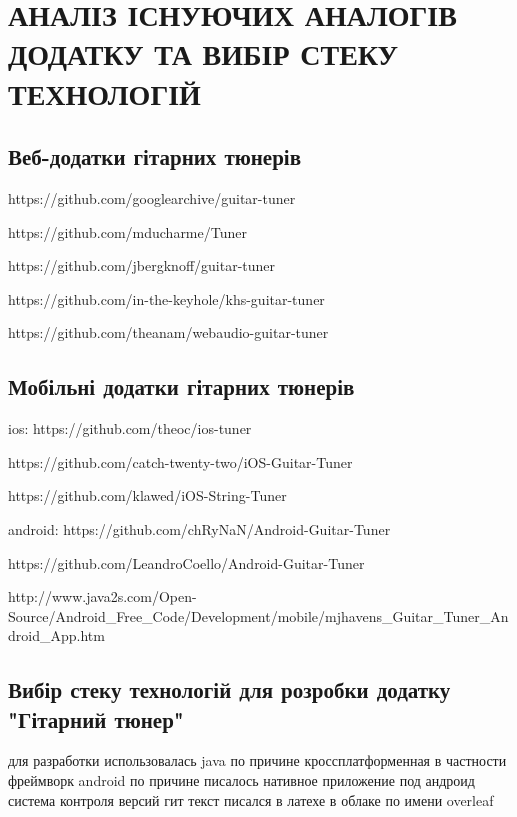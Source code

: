 \section{АНАЛІЗ ІСНУЮЧИХ АНАЛОГІВ ДОДАТКУ ТА ВИБІР СТЕКУ ТЕХНОЛОГІЙ}


\subsection{Веб-додатки гітарних тюнерів}

https://github.com/googlearchive/guitar-tuner

https://github.com/mducharme/Tuner

https://github.com/jbergknoff/guitar-tuner

https://github.com/in-the-keyhole/khs-guitar-tuner

https://github.com/theanam/webaudio-guitar-tuner

\subsection{Мобільні додатки гітарних тюнерів}
ios:
https://github.com/theoc/ios-tuner

https://github.com/catch-twenty-two/iOS-Guitar-Tuner

https://github.com/klawed/iOS-String-Tuner

android:
https://github.com/chRyNaN/Android-Guitar-Tuner

https://github.com/LeandroCoello/Android-Guitar-Tuner

http://www.java2s.com/Open-Source/Android_Free_Code/Development/mobile/mjhavens_Guitar_Tuner_Android_App.htm

\subsection{Вибір стеку технологій для розробки додатку "Гітарний тюнер"}

для разработки использовалась java по причине кроссплатформенная в частности фреймворк android по причине писалось нативное приложение под андроид
система контроля версий гит
текст писался в латехе в облаке по имени overleaf